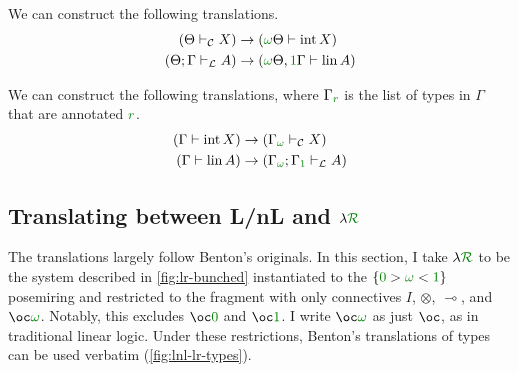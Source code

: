 \begin{proposition}
  We can construct the following translations.
  \begin{align}
    (\Theta \vdash_{\mathcal C} X) &\to (\gr\omega\Theta \vdash \intu X) \\
    (\Theta; \Gamma \vdash_{\mathcal L} A) &\to
    (\gr\omega\Theta, \gr1\Gamma \vdash \lin A)
  \end{align}
\end{proposition}

\begin{proposition}
  We can construct the following translations, where $\Gamma_{\gr r}$ is the
  list of types in $\Gamma$ that are annotated $\gr r$.%
  \begin{align}
    (\Gamma \vdash \intu X) &\to (\Gamma_{\gr\omega} \vdash_{\mathcal C} X) \\
    (\Gamma \vdash \lin A) &\to
    (\Gamma_{\gr\omega}; \Gamma_{\gr1} \vdash_{\mathcal L} A)
  \end{align}
\end{proposition}

\subsection{Translating between L/nL and $\lambda\gr{\mathcal R}$}

The translations largely follow Benton's originals.
In this section, I take $\name$ to be the system described in
\cref{fig:lr-bunched} instantiated to the $\{\gr0 > \gr\omega < \gr1\}$
posemiring and restricted to the fragment with only connectives $I$, $\otimes$,
$\multimap$, and $\oc\gr\omega$.
Notably, this excludes $\oc\gr0$ and $\oc\gr1$.
I write $\oc\gr\omega$ as just $\oc$, as in traditional linear logic.
Under these restrictions, Benton's translations of types can be used verbatim
(\cref{fig:lnl-lr-types}).

